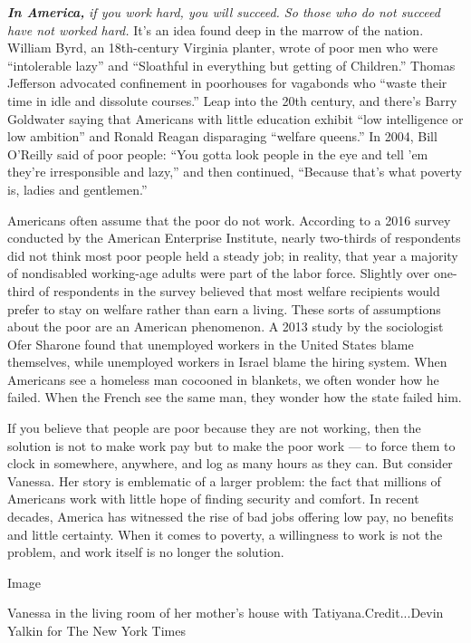\emph{\textbf{In America,}} \emph{if you work hard, you will succeed. So
those who do not succeed have not worked hard.} It's an idea found deep
in the marrow of the nation. William Byrd, an 18th-century Virginia
planter, wrote of poor men who were ``intolerable lazy'' and ``Sloathful
in everything but getting of Children.'' Thomas Jefferson advocated
confinement in poorhouses for vagabonds who ``waste their time in idle
and dissolute courses.'' Leap into the 20th century, and there's Barry
Goldwater saying that Americans with little education exhibit ``low
intelligence or low ambition'' and Ronald Reagan disparaging ``welfare
queens.'' In 2004, Bill O'Reilly said of poor people: ``You gotta look
people in the eye and tell 'em they're irresponsible and lazy,'' and
then continued, ``Because that's what poverty is, ladies and
gentlemen.''

Americans often assume that the poor do not work. According to a 2016
survey conducted by the American Enterprise Institute, nearly two-thirds
of respondents did not think most poor people held a steady job; in
reality, that year a majority of nondisabled working-age adults were
part of the labor force. Slightly over one-third of respondents in the
survey believed that most welfare recipients would prefer to stay on
welfare rather than earn a living. These sorts of assumptions about the
poor are an American phenomenon. A 2013 study by the sociologist Ofer
Sharone found that unemployed workers in the United States blame
themselves, while unemployed workers in Israel blame the hiring system.
When Americans see a homeless man cocooned in blankets, we often wonder
how he failed. When the French see the same man, they wonder how the
state failed him.

If you believe that people are poor because they are not working, then
the solution is not to make work pay but to make the poor work --- to
force them to clock in somewhere, anywhere, and log as many hours as
they can. But consider Vanessa. Her story is emblematic of a larger
problem: the fact that millions of Americans work with little hope of
finding security and comfort. In recent decades, America has witnessed
the rise of bad jobs offering low pay, no benefits and little certainty.
When it comes to poverty, a willingness to work is not the problem, and
work itself is no longer the solution.

Image

Vanessa in the living room of her mother's house with
Tatiyana.Credit...Devin Yalkin for The New York Times

